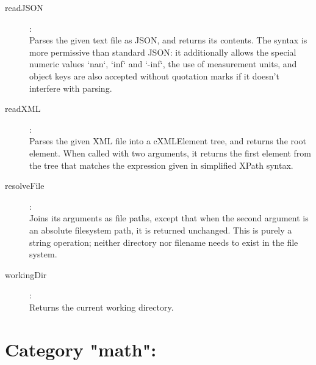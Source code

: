 \begin{description}
\item[readJSON]:  \\
    Parses the given text file as JSON, and returns its contents. The syntax is
    more permissive than standard JSON: it additionally allows the special
    numeric values `nan`, `inf` and `-inf`, the use of measurement units, and
    object keys are also accepted without quotation marks if it doesn't
    interfere with parsing.

\item[readXML]:  \\
    Parses the given XML file into a cXMLElement tree, and returns the root
    element. When called with two arguments, it returns the first element from
    the tree that matches the expression given in simplified XPath syntax.

\item[resolveFile]:  \\
    Joins its arguments as file paths, except that when the second argument is
    an absolute filesystem path, it is returned unchanged. This is purely a
    string operation; neither directory nor filename needs to exist in the file
    system.

\item[workingDir]:  \\
    Returns the current working directory.


\end{description}

\section{Category "math":}
\label{sec:ned-functions:category-math}

